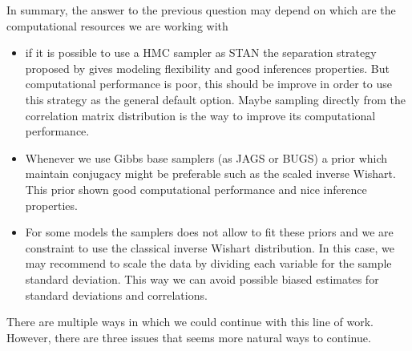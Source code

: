 \documentclass{article}
\begin{document}
In summary, the answer to the previous question may depend on which are the computational resources we are working with 

\begin{itemize}
\item  if it is possible to use a HMC sampler as STAN the separation strategy proposed by \cite{barnard2000} gives modeling flexibility and good inferences properties. But computational performance is poor, this should be improve in order to use this strategy as the general default option. Maybe sampling directly from the correlation matrix distribution is the way to improve its computational performance.  

\item Whenever we use Gibbs base samplers (as JAGS or BUGS) a prior which maintain conjugacy might be preferable such as the scaled inverse Wishart. This prior shown good computational performance and nice inference properties.  

\item For some models the samplers does not allow to fit these priors and we are constraint to use the classical inverse Wishart distribution. In this case, we may recommend to scale the data by dividing each variable for the sample standard deviation. This way we can avoid possible biased estimates for standard deviations and correlations. 
\end{itemize}

There are multiple ways in which we could continue with this line of work. However, there are three issues that seems more natural ways to continue. 
\end{document}

